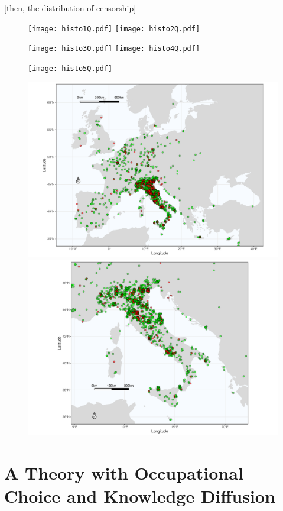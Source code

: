 \documentclass[12pt]{article}
\begin{document}
[then, the distribution of censorship]




\begin{figure}[p]
\texttt{[image: histo1Q.pdf]}
\texttt{[image: histo2Q.pdf]}

\texttt{[image: histo3Q.pdf]}
\texttt{[image: histo4Q.pdf]}

\texttt{[image: histo5Q.pdf]}
\end{figure}

\begin{figure}[p]
\includegraphics[width=.9\textwidth]{map-europe.pdf}
\includegraphics[width=.9\textwidth]{map-italy.pdf}
\end{figure}

\clearpage

\section{A Theory with Occupational Choice and Knowledge Diffusion}\label{section:theory}
\end{document}

